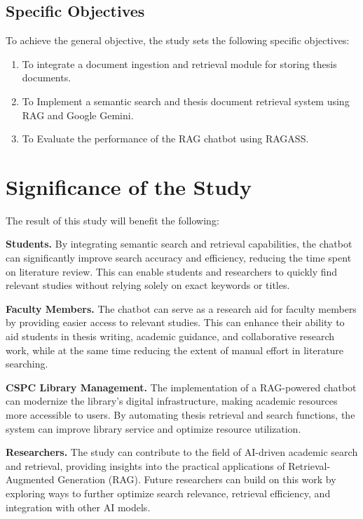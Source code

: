 \begin{refsection}
\subsection{Specific Objectives}

To achieve the general objective, the study sets the following specific objectives:
\begin{enumerate}

    \item To integrate a document ingestion and retrieval module for storing thesis documents.
    \item To Implement a semantic search and thesis document retrieval system using RAG and Google Gemini.
    \item To Evaluate the performance of the RAG chatbot using RAGASS.

\end{enumerate}


\clearpage
\section{Significance of the Study}

The result of this study will benefit the following:

\bigbreak
\noindent \textbf{Students.}  By integrating semantic search and retrieval capabilities, the chatbot can significantly improve search accuracy and efficiency, reducing the time spent on literature review. This can enable students and researchers to quickly find relevant studies without relying solely on exact keywords or titles.

\bigbreak
\noindent \textbf{Faculty Members.}  The chatbot can serve as a research aid for faculty members by providing easier access to relevant studies. This can enhance their ability to aid students in thesis writing, academic guidance, and collaborative research work, while at the same time reducing the extent of manual effort in literature searching.

\bigbreak
\noindent \textbf{CSPC Library Management.} The implementation of a RAG-powered chatbot can modernize the library’s digital infrastructure, making academic resources more accessible to users. By automating thesis retrieval and search functions, the system can improve library service and optimize resource utilization.

\bigbreak
\noindent \textbf{Researchers.} The study can contribute to the field of AI-driven academic search and retrieval, providing insights into the practical applications of Retrieval-Augmented Generation (RAG). Future researchers can build on this work by exploring ways to further optimize search relevance, retrieval efficiency, and integration with other AI models.


\end{refsection}
